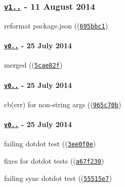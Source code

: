 \subsubsection*{\href{https://github.com/browserify/resolve/compare/v0.7.4...v1.0.0}{\tt v1..} -\/ 11 August 2014}


\begin{DoxyItemize}
\item reformat package.\+json ((\href{https://github.com/browserify/resolve/commit/695bbc1d9eeb35339b4a01e141c6f6e1dff3a6e3}{\tt {\ttfamily 695bbc1}})
\end{DoxyItemize}

\paragraph*{\href{https://github.com/browserify/resolve/compare/v0.7.3...v0.7.4}{\tt v0..} -\/ 25 July 2014}


\begin{DoxyItemize}
\item merged ((\href{https://github.com/browserify/resolve/commit/5cae82fb22cb64d5b72f703c787dc0fd418ed412}{\tt {\ttfamily 5cae82f}})
\end{DoxyItemize}

\paragraph*{\href{https://github.com/browserify/resolve/compare/v0.7.2...v0.7.3}{\tt v0..} -\/ 25 July 2014}


\begin{DoxyItemize}
\item cb(err) for non-\/string args ((\href{https://github.com/browserify/resolve/commit/965c70b27ff796fc0ac3dba186d95b61d82446df}{\tt {\ttfamily 965c70b}})
\end{DoxyItemize}

\paragraph*{\href{https://github.com/browserify/resolve/compare/v0.7.1...v0.7.2}{\tt v0..} -\/ 25 July 2014}


\begin{DoxyItemize}
\item failing dotdot test ((\href{https://github.com/browserify/resolve/commit/3ee0f0eb97971d246a4a3f183374f60938f1ca8a}{\tt {\ttfamily 3ee0f0e}})
\item fixes for dotdot tests ((\href{https://github.com/browserify/resolve/commit/a67f230133050568ca14a04c0d36aaf6bf14fa89}{\tt {\ttfamily a67f230}})
\item failing sync dotdot test ((\href{https://github.com/browserify/resolve/commit/55515e7f816571fb9d71fdd6d0f012185b2eeefb}{\tt {\ttfamily 55515e7}})
\end{DoxyItemize}

